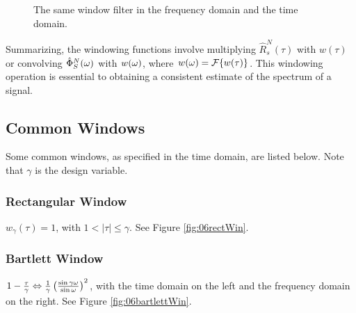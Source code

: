 \begin{figure}[ht!]
	\centering
	 \hfill
	\caption{The same window filter in the  frequency domain and the  time domain.}
	\label{fig:06windowfilter}
\end{figure}

Summarizing, the windowing functions involve multiplying $\hat{R}_s^N(\tau)$ with $w(\tau)$ or convolving $\hat{\Phi}_S^N(\omega)$ with $w(\omega)$, where $w(\omega)=\mathcal{F}\{w(\tau)\}$. This windowing operation is essential to obtaining a consistent estimate of the spectrum of a signal.

\subsection{Common Windows}
Some common windows, as specified in the time domain, are listed below. Note that $\gamma$ is the design variable.

\subsubsection{Rectangular Window}
$w_\gamma(\tau) = 1$, with $1<|\tau|\leq\gamma$. See Figure \ref{fig:06rectWin}.

\subsubsection{Bartlett Window}
$1-\frac{\tau}{\gamma} \Leftrightarrow \frac{1}{\gamma}\left(\frac{\sin\gamma\omega}{\sin\omega}\right)^2$, with the time domain on the left and the frequency domain on the right. See Figure \ref{fig:06bartlettWin}.

